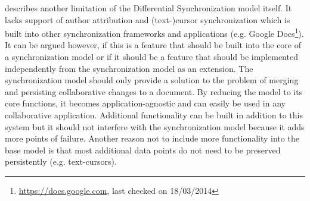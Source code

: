 \cite[p. 7]{fraser2009differential} describes another limitation of the Differential Synchronization model itself. It lacks support of author attribution and (text-)cursor synchronization which is built into other synchronization frameworks and applications (e.g. Google Docs\footnote{\url{https://docs.google.com}, last checked on 18/03/2014}). It can be argued however, if this is a feature that should be built into the core of a synchronization model or if it should be a feature that should be implemented independently from the synchronization model as an extension. The synchronization model should only provide a solution to the problem of merging and persisting collaborative changes to a document. By reducing the model to its core functions, it becomes application-agnostic and can easily be used in any collaborative application. Additional functionality can be built in addition to this system but it should not interfere with the synchronization model because it adds more points of failure. Another reason not to include more functionality into the base model is that most additional data points do not need to be preserved persistently (e.g. text-cursors).



